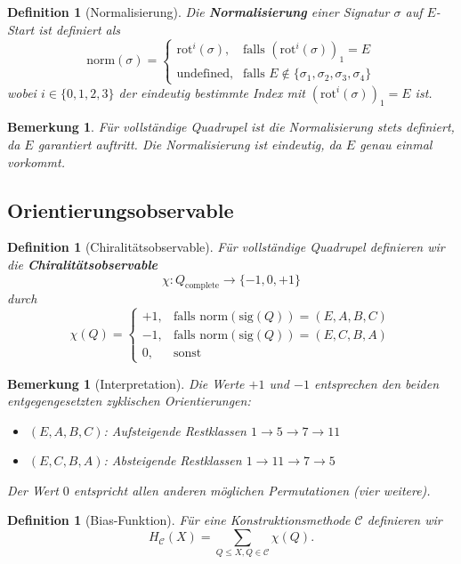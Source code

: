\documentclass[11pt,a4paper]{article}
\newtheorem{definition}[theorem]{Definition}
\newtheorem{remark}[theorem]{Bemerkung}
\begin{document}
\begin{definition}[Normalisierung]
Die \textbf{Normalisierung} einer Signatur $\sigma$ auf $E$-Start ist definiert als
\[
\text{norm}(\sigma) = \begin{cases}
\text{rot}^i(\sigma), & \text{falls } (\text{rot}^i(\sigma))_1 = E \\
\text{undefined}, & \text{falls } E \notin \{\sigma_1, \sigma_2, \sigma_3, \sigma_4\}
\end{cases}
\]
wobei $i \in \{0, 1, 2, 3\}$ der eindeutig bestimmte Index mit $(\text{rot}^i(\sigma))_1 = E$ ist.
\end{definition}

\begin{remark}
Für vollständige Quadrupel ist die Normalisierung stets definiert, da $E$ garantiert auftritt. Die Normalisierung ist eindeutig, da $E$ genau einmal vorkommt.
\end{remark}

\subsection{Orientierungsobservable}

\begin{definition}[Chiralitätsobservable]
Für vollständige Quadrupel definieren wir die \textbf{Chiralitätsobservable}
\[
\chi: Q_{\text{complete}} \to \{-1, 0, +1\}
\]
durch
\[
\chi(Q) = \begin{cases}
+1, & \text{falls } \text{norm}(\text{sig}(Q)) = (E, A, B, C) \\
-1, & \text{falls } \text{norm}(\text{sig}(Q)) = (E, C, B, A) \\
0, & \text{sonst}
\end{cases}
\]
\end{definition}

\begin{remark}[Interpretation]
Die Werte $+1$ und $-1$ entsprechen den beiden entgegengesetzten zyklischen Orientierungen:
\begin{itemize}
\item $(E, A, B, C)$: Aufsteigende Restklassen $1 \to 5 \to 7 \to 11$
\item $(E, C, B, A)$: Absteigende Restklassen $1 \to 11 \to 7 \to 5$
\end{itemize}
Der Wert $0$ entspricht allen anderen möglichen Permutationen (vier weitere).
\end{remark}

\begin{definition}[Bias-Funktion]
Für eine Konstruktionsmethode $\mathcal{C}$ definieren wir
\[
H_{\mathcal{C}}(X) = \sum_{Q \le X, Q \in \mathcal{C}} \chi(Q).
\]
\end{definition}
\end{document}
